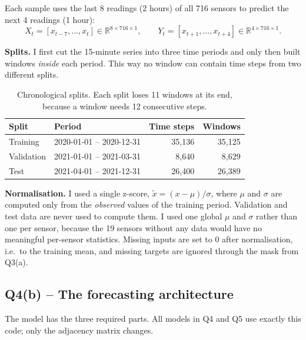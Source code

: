 \documentclass[11pt, a4paper]{article}
\begin{document}
Each sample uses the last 8 readings (2 hours) of all 716 sensors to predict the next 4 readings (1 hour):
\[
X_t = [x_{t-7}, \dots, x_t] \in \mathbb{R}^{8 \times 716 \times 1}, \qquad
Y_t = [x_{t+1}, \dots, x_{t+4}] \in \mathbb{R}^{4 \times 716 \times 1}.
\]

\textbf{Splits.} I first cut the 15-minute series into three time periods and only then built windows \emph{inside} each period. This way no window can contain time steps from two different splits.

\begin{table}[H]
\centering
\small
\begin{tabular}{@{}llrr@{}}
\toprule
Split & Period & Time steps & Windows \\
\midrule
Training   & 2020-01-01 -- 2020-12-31 & 35{,}136 & 35{,}125 \\
Validation & 2021-01-01 -- 2021-03-31 & 8{,}640  & 8{,}629 \\
Test       & 2021-04-01 -- 2021-12-31 & 26{,}400 & 26{,}389 \\
\bottomrule
\end{tabular}
\caption{Chronological splits. Each split loses 11 windows at its end, because a window needs 12 consecutive steps.}
\end{table}

\textbf{Normalisation.} I used a single z-score, $\tilde{x} = (x - \mu)/\sigma$, where $\mu$ and $\sigma$ are computed only from the \emph{observed} values of the training period. Validation and test data are never used to compute them. I used one global $\mu$ and $\sigma$ rather than one per sensor, because the 19 sensors without any data would have no meaningful per-sensor statistics. Missing inputs are set to $0$ after normalisation, i.e.\ to the training mean, and missing targets are ignored through the mask from Q3(a).

\subsection*{Q4(b) -- The forecasting architecture}

The model has the three required parts. All models in Q4 and Q5 use exactly this code; only the adjacency matrix changes.
\end{document}
